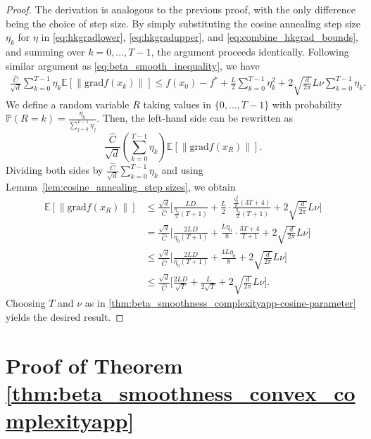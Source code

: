 \documentclass{article}
\newcommand{\rgrad}{\mathrm{grad}}
\newcommand{\pert}{\nu}
\theoremstyle{plain}
\theoremstyle{definition}
\theoremstyle{remark}
\begin{document}
\begin{proof}
The derivation is analogous to the previous proof, with the only difference being the choice of step size. By simply substituting the cosine annealing step size $\eta_k$ for $\eta$ in \eqref{eq:hkgradlower}, \eqref{eq:hkgradupper}, and \eqref{eq:combine_hkgrad_bounds}, and summing over $k=0, \dots, T-1$, the argument proceeds identically. Following similar argument as \eqref{eq:beta_smooth_inequality}, we have
\begin{align*}
\frac{\hat{C}}{\sqrt{d}}
\sum_{k=0}^{T-1} \eta_k 
\mathbb{E}\left[ \left\| {\rgrad} f(x_k) \right\| \right]
\le
 f(x_0) - f^* + \frac{{L}}{2} \sum_{k=0}^{T-1} \eta_k^{2}
+ 2\sqrt{\frac{d}{2\pi}}{L}\pert \sum_{k=0}^{T-1} \eta_k.
\end{align*}
We define a random variable $R$ taking values in $\{0, \dots, T-1\}$ with probability $\mathbb{P}(R=k) = \frac{\eta_k}{\sum_{j=0}^{T-1} \eta_j}$. Then, the left-hand side can be rewritten as
\[
\frac{\hat{C}}{\sqrt{d}} \left(\sum_{k=0}^{T-1} \eta_k\right) \mathbb{E}[\|\rgrad f(x_R)\|].
\]
Dividing both sides by $\frac{\hat{C}}{\sqrt{d}}\sum_{k=0}^{T-1} \eta_k$ and using Lemma~\ref{lem:cosine_annealing_step sizes}, we obtain
\begin{align*}
\mathbb{E}\left[ \|\rgrad f(x_R)\| \right]
&\leq
\frac{\sqrt{d}}{\hat{C}}\Bigg[
    \frac{{L} D}{\frac{\eta_0}{2}(T+1)}
    + \frac{{L}}{2} \cdot \frac{\frac{\eta_0^2}{8}(3T+4)}{\frac{\eta_0}{2}(T+1)}
    + 2\sqrt{\frac{d}{2\pi}}{L}\pert
\Bigg]\\
&= 
\frac{\sqrt{d}}{\hat{C}}\Bigg[
    \frac{2{L} D}{\eta_{0}(T+1)}
    + \frac{{L} \eta_{0}}{8}\cdot\frac{3T+4}{T+1}
    + 2\sqrt{\frac{d}{2\pi}}{L}\pert
\Bigg]\\
&\leq 
\frac{\sqrt{d}}{\hat{C}}\Bigg[
    \frac{2{L} D}{\eta_{0}(T+1)}
    + \frac{4{L} \eta_{0}}{8}
    + 2\sqrt{\frac{d}{2\pi}}{L}\pert
\Bigg]\\
&\leq 
\frac{\sqrt{d}}{\hat{C}}\Bigg[
    \frac{2{L} D}{\sqrt{T}}
    + \frac{{L}}{2\sqrt{T}}
    + 2\sqrt{\frac{d}{2\pi}}{L}\pert
\Bigg].
\end{align*}
Choosing $T$ and $\pert$ as in \eqref{thm:beta_smoothness_complexityapp-cosine-parameter} yields the desired result.
\end{proof}




\section{Proof of Theorem \ref{thm:beta_smoothness_convex_complexityapp}}
\end{document}
